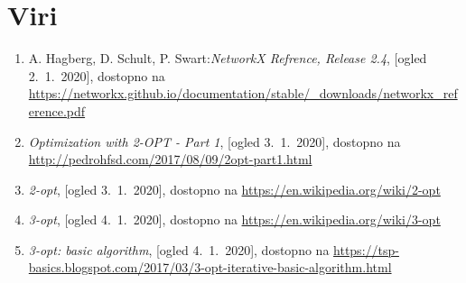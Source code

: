 \documentclass[12pt, a4paper]{article}
\begin{document}
\newpage
\section[Viri]{Viri}

\begin{enumerate}

\item A. Hagberg, D. Schult, P. Swart:\emph{NetworkX Refrence, Release 2.4}, [ogled 2.~1.~2020], dostopno na \url{https://networkx.github.io/documentation/stable/_downloads/networkx_reference.pdf}

\item \emph{Optimization with 2-OPT - Part 1}, [ogled 3.~1.~2020], dostopno na \url{http://pedrohfsd.com/2017/08/09/2opt-part1.html}

\item \emph{2-opt}, [ogled 3.~1.~2020], dostopno na \url{https://en.wikipedia.org/wiki/2-opt}

\item \emph{3-opt}, [ogled 4.~1.~2020], dostopno na \url{https://en.wikipedia.org/wiki/3-opt}

\item \emph{3-opt: basic algorithm}, [ogled 4.~1.~2020], dostopno na \url{https://tsp-basics.blogspot.com/2017/03/3-opt-iterative-basic-algorithm.html}
\end{enumerate}
\end{document}
